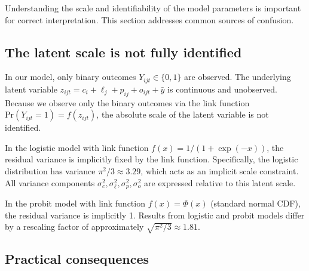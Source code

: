 Understanding the scale and identifiability of the model parameters is important for correct interpretation. This section addresses common sources of confusion.

\subsection*{The latent scale is not fully identified}

In our model, only binary outcomes $Y_{ijt} \in \{0,1\}$ are observed. The underlying latent variable $z_{ijt} = c_i + \ell_j + p_{ij} + o_{ijt} + \bar{y}$ is continuous and unobserved. Because we observe only the binary outcomes via the link function $\text{Pr}(Y_{ijt}=1) = f(z_{ijt})$, the absolute scale of the latent variable is not identified.

In the logistic model with link function $f(x) = 1/(1+\exp(-x))$, the residual variance is implicitly fixed by the link function. Specifically, the logistic distribution has variance $\pi^2/3 \approx 3.29$, which acts as an implicit scale constraint. All variance components $\sigma_c^2, \sigma_\ell^2, \sigma_p^2, \sigma_o^2$ are expressed relative to this latent scale.

In the probit model with link function $f(x) = \Phi(x)$ (standard normal CDF), the residual variance is implicitly 1. Results from logistic and probit models differ by a rescaling factor of approximately $\sqrt{\pi^2/3} \approx 1.81$.

\subsection*{Practical consequences}

